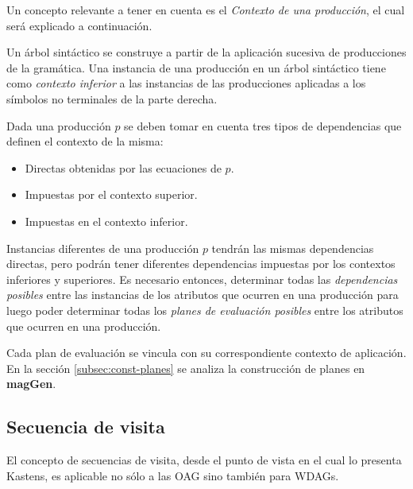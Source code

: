 \documentclass[runningheads,a4paper]{llncs}
\newcommand{\maggen}{\textbf{magGen}}
\begin{document}
Un concepto relevante a tener en cuenta es el \textit{Contexto de una producción}, el cual será explicado a continuación.

Un árbol sintáctico se construye a partir de la aplicación sucesiva de producciones de la gramática. Una instancia de una producción en un árbol sintáctico tiene como \emph{contexto inferior} a las instancias de las producciones aplicadas a los símbolos no terminales de la parte derecha.

Dada una producción $p$ se deben tomar en cuenta tres tipos de dependencias que definen el contexto de la misma:
\begin{itemize}
\item Directas obtenidas por las ecuaciones de $p$.
\item Impuestas por el contexto superior.
\item Impuestas en el contexto inferior.
\end{itemize}

Instancias diferentes de una producción $p$ tendrán las mismas dependencias directas, pero podrán tener diferentes dependencias impuestas por los contextos inferiores y superiores. Es necesario entonces, determinar todas las \emph{dependencias posibles} entre las instancias de los atributos que ocurren en una producción para luego poder determinar todas los \emph{planes de evaluación posibles} entre los atributos que ocurren en una producción.

Cada plan de evaluación se vincula con su correspondiente contexto de aplicación.
En la sección \ref{subsec:const-planes} se analiza la construcción de planes en \maggen.


\subsection{Secuencia de visita}
\label{sec:sec-visit}

El concepto de secuencias de visita, desde el punto de vista en el cual lo presenta Kastens, es aplicable no sólo a las OAG sino también para WDAGs.
\end{document}
